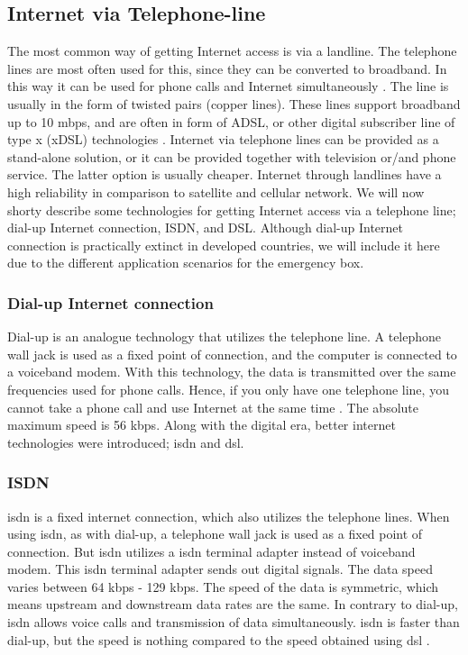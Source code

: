 \subsection{Internet via Telephone-line}
The most common way of getting Internet access is via a landline. The telephone lines are most often used for this, since they can be converted to broadband. In this way it can be used for phone calls and Internet simultaneously \cite{internet}. The line is usually in the form of twisted pairs (copper lines). These lines support broadband up to 10 \gls{mbps}, and are often in form of ADSL, or other digital subscriber line of type x (xDSL) technologies \cite{audestad}. Internet via telephone lines can be provided as a stand-alone solution, or it can be provided together with television or/and phone service. The latter option is usually cheaper. Internet through landlines have a high reliability \cite{cablevssatellite} in comparison to satellite and cellular network. We will now shorty describe some technologies for getting Internet access via a telephone line; dial-up Internet connection, ISDN, and DSL. Although dial-up Internet connection is practically extinct in developed countries, we will include it here due to the different application scenarios for the emergency box. 

\subsubsection{Dial-up Internet connection}
Dial-up is an analogue technology that utilizes the telephone line. A telephone wall jack is used as a fixed point of connection, and the computer is connected to a voiceband modem. With this technology, the data is transmitted over the same frequencies used for phone calls. Hence, if you only have one telephone line, you cannot take a phone call and use Internet at the same time \cite{differentuplinks}. The absolute maximum speed is 56 \gls{kbps}. Along with the digital era, better internet technologies were introduced; \gls{isdn} and \gls{dsl}. 

\subsubsection{ISDN}
\gls{isdn} is a fixed internet connection, which also utilizes the telephone lines. When using \gls{isdn}, as with dial-up, a telephone wall jack is used as a fixed point of connection. But \gls{isdn} utilizes a \gls{isdn} terminal adapter instead of voiceband modem. This \gls{isdn} terminal adapter sends out digital signals. The data speed varies between 64 \gls{kbps} - 129 \gls{kbps}. The speed of the data is symmetric, which means upstream and downstream data rates are the same. In contrary to dial-up, \gls{isdn} allows voice calls and transmission of data simultaneously. \gls{isdn} is faster than dial-up, but the speed is nothing compared to the speed obtained using \gls{dsl} \cite{differentuplinks}. 

